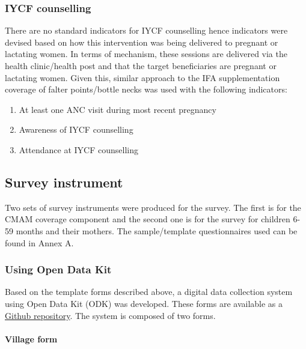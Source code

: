 \documentclass[12pt,a4paper]{article}
\let\oldparagraph\paragraph
\renewcommand{\paragraph}[1]{\oldparagraph{#1}\mbox{}}
\begin{document}
\hypertarget{iycf-counselling}{%
\subsubsection{IYCF counselling}\label{iycf-counselling}}

There are no standard indicators for IYCF counselling hence indicators were devised based on how this intervention was being delivered to pregnant or lactating women. In terms of mechanism, these sessions are delivered via the health clinic/health post and that the target beneficiaries are pregnant or lactating women. Given this, similar approach to the IFA supplementation coverage of falter points/bottle necks was used with the following indicators:

\begin{enumerate}
\def\labelenumi{\arabic{enumi}.}
\item
  At least one ANC visit during most recent pregnancy
\item
  Awareness of IYCF counselling
\item
  Attendance at IYCF counselling
\end{enumerate}

\hypertarget{survey-instrument}{%
\subsection{Survey instrument}\label{survey-instrument}}

Two sets of survey instruments were produced for the survey. The first is for the CMAM coverage component and the second one is for the survey for children 6-59 months and their mothers. The sample/template questionnaires used can be found in Annex A.

\hypertarget{using-open-data-kit}{%
\subsubsection{Using Open Data Kit}\label{using-open-data-kit}}

Based on the template forms described above, a digital data collection system using Open Data Kit (ODK) was developed. These forms are available as a \href{https://github.com/validmeasures/liberiaS3Mforms}{Github repository}. The system is composed of two forms.

\hypertarget{village-form}{%
\paragraph{Village form}\label{village-form}}
\end{document}
